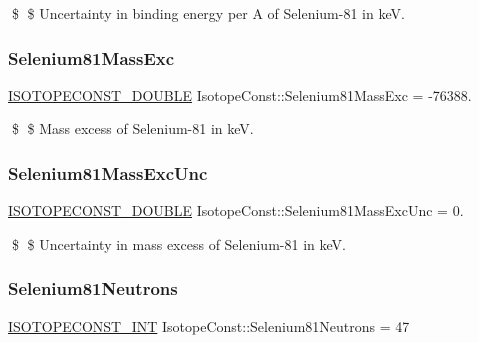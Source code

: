 \$ \$ Uncertainty in binding energy per A of Selenium-\/81 in keV. \mbox{\label{group___isotope_const-_selenium-_se81_gab0be4fb60ebd25ed2d25cd4f9cc15691}} 
\subsubsection{\texorpdfstring{Selenium81\+Mass\+Exc}{Selenium81MassExc}}
{\footnotesize\ttfamily \mbox{\hyperlink{group___isotope_const-_macros_ga8f45a7272ce02c0b4c65c44636ed719a}{I\+S\+O\+T\+O\+P\+E\+C\+O\+N\+S\+T\+\_\+\+D\+O\+U\+B\+LE}} Isotope\+Const\+::\+Selenium81\+Mass\+Exc = -\/76388.}

\$ \$ Mass excess of Selenium-\/81 in keV. \mbox{\label{group___isotope_const-_selenium-_se81_ga67528d288f5090771c9e4ad32b97a43e}} 
\subsubsection{\texorpdfstring{Selenium81\+Mass\+Exc\+Unc}{Selenium81MassExcUnc}}
{\footnotesize\ttfamily \mbox{\hyperlink{group___isotope_const-_macros_ga8f45a7272ce02c0b4c65c44636ed719a}{I\+S\+O\+T\+O\+P\+E\+C\+O\+N\+S\+T\+\_\+\+D\+O\+U\+B\+LE}} Isotope\+Const\+::\+Selenium81\+Mass\+Exc\+Unc = 0.}

\$ \$ Uncertainty in mass excess of Selenium-\/81 in keV. \mbox{\label{group___isotope_const-_selenium-_se81_ga8295fdcd620174107f1d0e2a44c8ee82}} 
\subsubsection{\texorpdfstring{Selenium81\+Neutrons}{Selenium81Neutrons}}
{\footnotesize\ttfamily \mbox{\hyperlink{group___isotope_const-_macros_ga5f18360b3e99483a35c32d789e62621c}{I\+S\+O\+T\+O\+P\+E\+C\+O\+N\+S\+T\+\_\+\+I\+NT}} Isotope\+Const\+::\+Selenium81\+Neutrons = 47}

